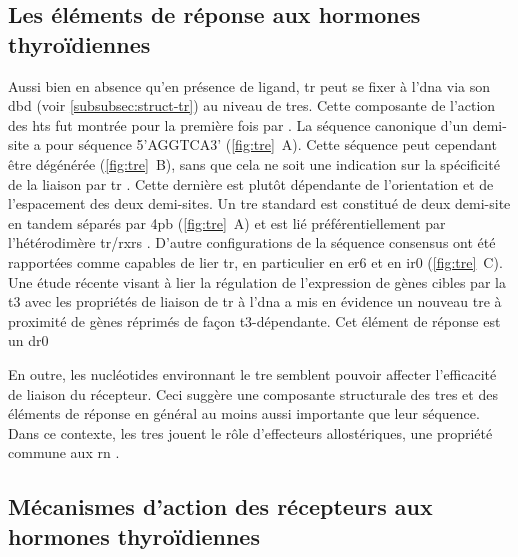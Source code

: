 \documentclass[../main.tex]{subfiles}
\begin{document}



\subsection{Les éléments de réponse aux hormones thyroïdiennes}
Aussi bien en absence qu'en présence de ligand, \gls{tr} peut se fixer à l'\gls{dna} via son \gls{dbd} (voir \autoref{subsubsec:struct-tr}) au niveau de \glspl{tre}.
Cette composante de l'action des \glspl{ht} fut montrée pour la première fois par \citet{Wight1987}.
La séquence canonique d'un demi-site a pour séquence 5'AGGTCA3' (\autoref{fig:tre}~A).
Cette séquence peut cependant être dégénérée (\autoref{fig:tre}~B), sans que cela ne soit une indication sur la spécificité de la liaison par \gls{tr} \citep{Chatonnet2013}.
Cette dernière est plutôt dépendante de l'orientation et de l'espacement des deux demi-sites.
Un \gls{tre} standard est constitué de deux demi-site en tandem séparés par 4pb (\autoref{fig:tre}~A) et est lié préférentiellement par l'hétérodimère \gls{tr}/\glspl{rxr} \citep{Wahlstrom1992}.
D'autre configurations de la séquence consensus ont été rapportées comme capables de lier \gls{tr}, en particulier en \gls{er6} et en \gls{ir0} (\autoref{fig:tre}~C).
Une étude récente visant à lier la régulation de l'expression de gènes cibles par la \gls{t3} avec les propriétés de liaison de \gls{tr} à l'\gls{dna} a mis en évidence un nouveau \gls{tre} à proximité de gènes réprimés de façon \gls{t3}-dépendante.
Cet élément de réponse est un \gls{dr0} \citep{Ramadoss2014}



En outre, les nucléotides environnant le \gls{tre} semblent pouvoir affecter l'efficacité de liaison du récepteur.
Ceci suggère une composante structurale des \glspl{tre} et des éléments de réponse en général au moins aussi importante que leur séquence.
Dans ce contexte, les \glspl{tre} jouent le rôle d'effecteurs allostériques, une propriété commune aux \gls{rn} \citep{Hall2002,Billas2013}.


\subsection{Mécanismes d'action des récepteurs aux hormones thyroïdiennes}
\end{document}

